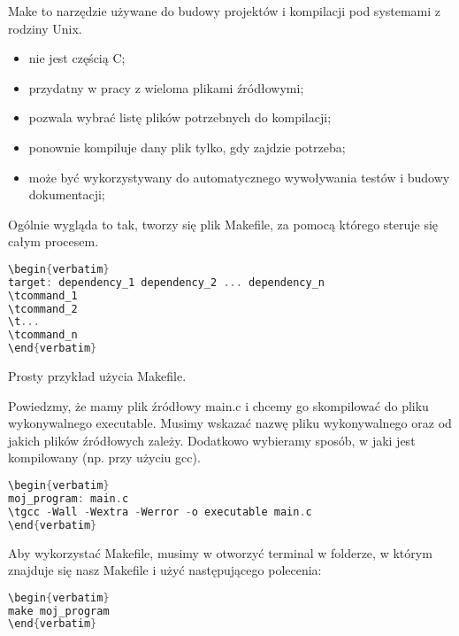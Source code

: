 \documentclass[notheorems, aspectratio=54]{beamer}
\begin{document}
\begin{frame}
Make to narzędzie używane do budowy projektów i kompilacji pod systemami z rodziny Unix.

\begin{itemize}
\item nie jest częścią C;
\item przydatny w pracy z wieloma plikami źródłowymi;
\item pozwala wybrać listę plików potrzebnych do kompilacji;
\item ponownie kompiluje dany plik tylko, gdy zajdzie potrzeba;
\item może być wykorzystywany do automatycznego wywoływania testów i budowy dokumentacji;
\end{itemize}

Ogólnie wygląda to tak, tworzy się plik Makefile, za pomocą którego steruje się całym procesem.

\begin{lstlisting}[language=C++]
\begin{verbatim}
target: dependency_1 dependency_2 ... dependency_n
\tcommand_1
\tcommand_2
\t...
\tcommand_n
\end{verbatim}
\end{lstlisting}

\end{frame}

\begin{frame}

Prosty przykład użycia Makefile.

Powiedzmy, że mamy plik źródłowy main.c i chcemy go skompilować do pliku wykonywalnego executable.
Musimy wskazać nazwę pliku wykonywalnego oraz od jakich plików źródłowych zależy. Dodatkowo
wybieramy sposób, w jaki jest kompilowany (np. przy użyciu gcc).

\begin{lstlisting}[language=C++]
\begin{verbatim}
moj_program: main.c
\tgcc -Wall -Wextra -Werror -o executable main.c
\end{verbatim}
\end{lstlisting}

Aby wykorzystać Makefile, musimy w otworzyć terminal w folderze, w którym znajduje się nasz
Makefile i użyć następującego polecenia:

\begin{lstlisting}[language=C++]
\begin{verbatim}
make moj_program
\end{verbatim}
\end{lstlisting}

\end{frame}
\end{document}

